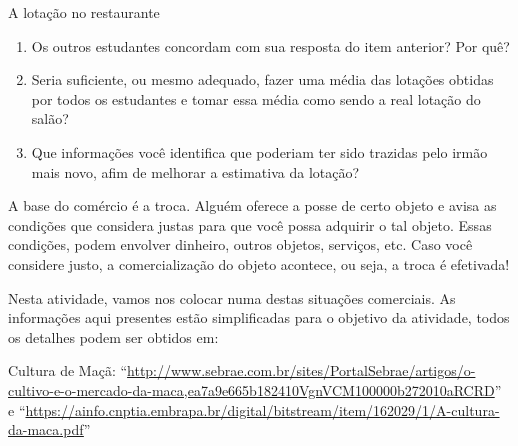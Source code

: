 \begin{task}{A lotação no restaurante}
\begin{enumerate}
\item {} 
Os outros estudantes concordam com sua resposta do item anterior? Por quê?

\item {} 
Seria suficiente, ou mesmo adequado, fazer uma média das lotações obtidas por todos os estudantes e tomar essa média como sendo a real lotação do salão?

\item {} 
Que informações você identifica que poderiam ter sido trazidas pelo irmão mais novo, afim de melhorar a estimativa da lotação?

\end{enumerate}
\end{task}



A base do comércio é a troca. Alguém oferece a posse de certo objeto e avisa as condições que considera justas para que você possa adquirir o tal objeto. Essas condições, podem envolver dinheiro, outros objetos, serviços, etc. Caso você considere justo, a comercialização do objeto acontece, ou seja, a troca é efetivada!

Nesta atividade, vamos nos colocar numa destas situações comerciais. As informações aqui presentes estão simplificadas para o objetivo da atividade, todos os detalhes podem ser obtidos em:

Cultura de Maçã: “\url{http://www.sebrae.com.br/sites/PortalSebrae/artigos/o-cultivo-e-o-mercado-da-maca,ea7a9e665b182410VgnVCM100000b272010aRCRD}” e “\url{https://ainfo.cnptia.embrapa.br/digital/bitstream/item/162029/1/A-cultura-da-maca.pdf}”


